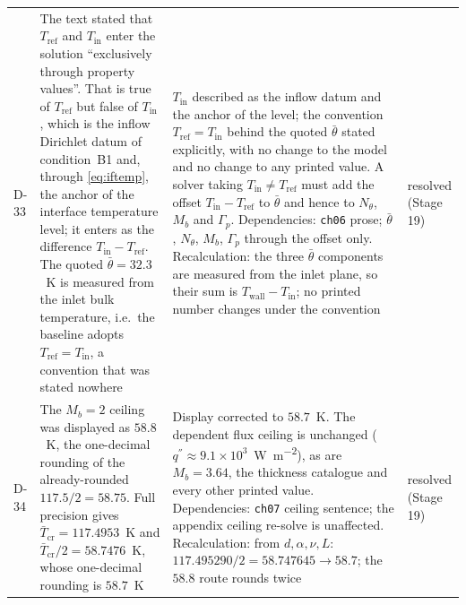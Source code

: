 \begin{longtable}{p{1cm}p{4.6cm}p{5.2cm}p{3.2cm}}
D-33 & The text stated that $T_{\mathrm{ref}}$ and $T_{\mathrm{in}}$ enter the solution ``exclusively through property values''. That is true of $T_{\mathrm{ref}}$ but false of $T_{\mathrm{in}}$, which is the inflow Dirichlet datum of condition~B1 and, through \eqref{eq:iftemp}, the anchor of the interface temperature level; it enters as the difference $T_{\mathrm{in}}-T_{\mathrm{ref}}$. The quoted $\bar\theta=32.3$~K is measured from the inlet bulk temperature, i.e.\ the baseline adopts $T_{\mathrm{ref}}=T_{\mathrm{in}}$, a convention that was stated nowhere & $T_{\mathrm{in}}$ described as the inflow datum and the anchor of the level; the convention $T_{\mathrm{ref}}=T_{\mathrm{in}}$ behind the quoted $\bar\theta$ stated explicitly, with no change to the model and no change to any printed value. A solver taking $T_{\mathrm{in}}\ne T_{\mathrm{ref}}$ must add the offset $T_{\mathrm{in}}-T_{\mathrm{ref}}$ to $\bar\theta$ and hence to $N_\theta$, $M_b$ and $\Gamma_p$. Dependencies: \texttt{ch06} prose; $\bar\theta$, $N_\theta$, $M_b$, $\Gamma_p$ through the offset only. Recalculation: the three $\bar\theta$ components are measured from the inlet plane, so their sum is $T_{\mathrm{wall}}-T_{\mathrm{in}}$; no printed number changes under the convention & resolved (Stage 19) \\
D-34 & The $M_b=2$ ceiling was displayed as $58.8$~K, the one-decimal rounding of the already-rounded $117.5/2=58.75$. Full precision gives $\bar T_{\mathrm{cr}}=117.4953$~K and $\bar T_{\mathrm{cr}}/2=58.7476$~K, whose one-decimal rounding is $58.7$~K & Display corrected to $58.7$~K. The dependent flux ceiling is unchanged ($q^{''}\approx9.1\times10^{3}$~\si{\watt\per\square\metre}), as are $M_b=3.64$, the thickness catalogue and every other printed value. Dependencies: \texttt{ch07} ceiling sentence; the appendix ceiling re-solve is unaffected. Recalculation: from $d,\alpha,\nu,L$: $117.495290/2=58.747645\to58.7$; the $58.8$ route rounds twice & resolved (Stage 19) \\

\end{longtable}
